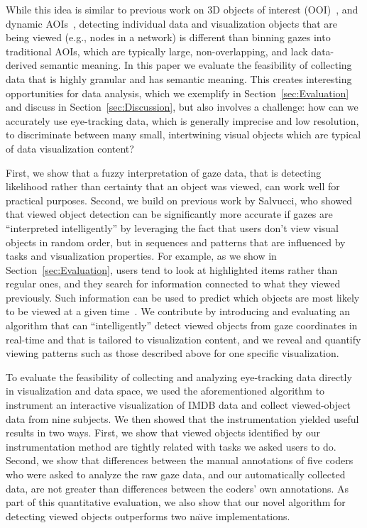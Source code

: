 While this idea is similar to previous work on 3D objects of interest (OOI)~\cite{stellmach20103d}, and  dynamic AOIs~\cite{papenmeier2010dynaoi}, detecting individual data and visualization objects that are being viewed (e.g., nodes in a network) is different than binning gazes into traditional AOIs, which are typically large, non-overlapping, and lack data-derived semantic meaning. In this paper we evaluate the feasibility of collecting data that is highly granular and has semantic meaning. This creates interesting opportunities for data analysis, which we exemplify in Section~\ref{sec:Evaluation} and discuss in Section~\ref{sec:Discussion}, but also involves a challenge: how can we accurately use eye-tracking data, which is generally imprecise and low resolution, to discriminate between many small, intertwining visual objects which are typical of data visualization content? 

First, we show that a fuzzy interpretation of gaze data, that is detecting likelihood rather than certainty that an object was viewed, can work well for practical purposes. Second, we build on previous work by Salvucci, who showed that viewed object detection can be significantly more accurate if gazes are ``interpreted intelligently'' by leveraging the fact that users don't view visual objects in random order, but in sequences and patterns that are influenced by tasks and visualization properties. For example, as we show in Section~\ref{sec:Evaluation}, users tend to look at highlighted items rather than regular ones, and they search for information connected to what they viewed previously. Such information can be used to predict which objects are most likely to be viewed at a given time~\cite{salvucci1999inferring, salvucci2000intelligent}. We contribute by introducing and evaluating an algorithm that can ``intelligently'' detect viewed objects from gaze coordinates in real-time and that is tailored to visualization content, and we reveal and quantify viewing patterns such as those described above for one specific visualization.  

To evaluate the feasibility of collecting and analyzing eye-tracking data directly in visualization and data space,  we used the aforementioned algorithm to instrument an interactive visualization of IMDB data and collect viewed-object data from nine subjects. We then showed that the instrumentation yielded useful results in two ways. First, we show that viewed objects identified by our instrumentation method are tightly related with tasks we asked users to do. Second, we show that differences between the manual annotations of five coders who were asked to analyze the raw gaze data, and our automatically collected data, are not greater than differences between the coders' own annotations. As part of this quantitative evaluation, we also show that our novel algorithm for detecting viewed objects outperforms two na\"{\i}ve implementations. 

